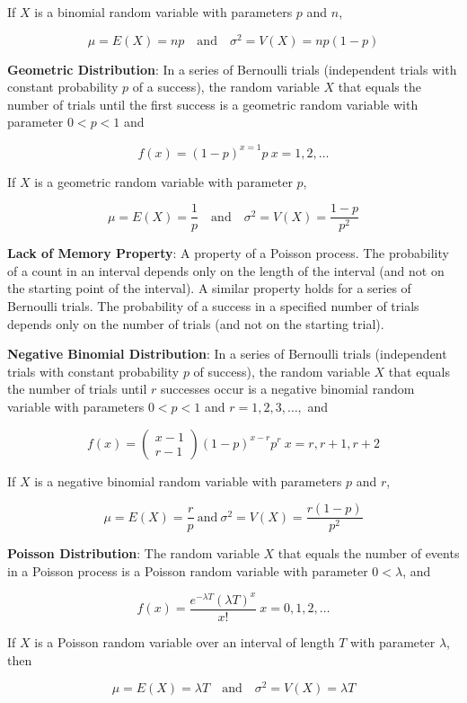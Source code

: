 \documentclass{article}
\begin{document}
If $X$ is a binomial random variable with parameters $p$ and $n$,

\[\mu=E(X)=np\quad\text{and}\quad\sigma^2=V(X)=np(1-p)\]

\noindent\textbf{\color{blue}Geometric Distribution}: In a series of Bernoulli trials (independent trials with constant probability $p$ of a success), the random variable $X$ that equals the number of trials until the first 
success is a geometric random variable with parameter $0<p<1$ and

\[f(x)=(1-p)^{x=1}p\ x=1,2,\ldots\]

If $X$ is a geometric random variable with parameter $p$,

\[\mu=E(X)=\frac{1}{p}\quad\text{and}\quad\sigma^2=V(X)=\frac{1-p}{p^2}\]

\noindent\textbf{\color{red}Lack of Memory Property}: A property of a Poisson process. The probability of a count in an interval depends only on the length of the interval (and not on the starting point of the interval). A similar property holds for a series of Bernoulli trials. The probability of a success in a specified number of trials depends only on the number of trials (and not on the starting trial).

\noindent\textbf{\color{blue}Negative Binomial Distribution}: In a series of Bernoulli trials (independent trials with constant probability $p$ of success), the random variable $X$ that equals the number of trials until $r$ 
successes occur is a negative binomial random variable with parameters $0<p<1$ and $r=1,2,3,\ldots,$ and

\[f(x)=\begin{pmatrix}x-1\\r-1\end{pmatrix}(1-p)^{x-r}p^r\ x=r,r+1,r+2\]

If $X$ is a negative binomial random variable with parameters $p$ and $r$,

\[\mu=E(X)=\frac{r}{p}\ \text{and}\ \sigma^2=V(X)=\frac{r(1-p)}{p^2}\]

\noindent\textbf{\color{blue}Poisson Distribution}: The random variable $X$ that equals the number of events in a Poisson process is a Poisson random variable with parameter $0<\lambda$, and

\[f(x)=\frac{e^{-\lambda T}(\lambda T)^{x}}{x!}\ x=0,1,2,\ldots\]

If $X$ is a Poisson random variable over an interval of length $T$ with parameter $\lambda$, then

\[\mu=E(X)=\lambda T\quad\text{and}\quad\sigma^2=V(X)=\lambda T\]
\end{document}
